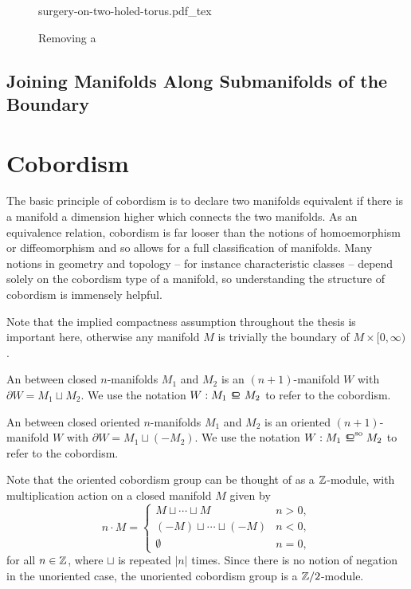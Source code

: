 \begin{figure}[ht]
	{surgery-on-two-holed-torus.pdf_tex}
	\caption{Removing a }
\end{figure}

\subsection{Joining Manifolds Along Submanifolds of the Boundary}

\pagebreak
\section{Cobordism}\label{sec:cobordism}

The basic principle of cobordism is to declare two manifolds equivalent if there is a manifold a dimension higher which connects the two manifolds. As an equivalence relation, cobordism is far looser than the notions of homoemorphism or diffeomorphism and so allows for a full classification of manifolds. Many notions in geometry and topology -- for instance characteristic classes -- depend solely on the cobordism type of a manifold, so understanding the structure of cobordism is immensely helpful.

\begin{remark}
	Note that the implied compactness assumption throughout the thesis is important here, otherwise any manifold $M$ is trivially the boundary of $M\times [0,\infty)$.
\end{remark}

\begin{definition}
	An  between closed $n$-manifolds $M_1$ and $M_2$ is an $(n+1)$-manifold $W$ with $\partial W = M_1\sqcup M_2$. We use the notation $W : M_1\bord M_2$ to refer to the cobordism.
\end{definition}

\begin{definition}
	An  between closed oriented $n$-manifolds $M_1$ and $M_2$ is an oriented $(n+1)$-manifold $W$ with $\partial W = M_1\sqcup (-M_2)$. We use the notation $W : M_1\sobord M_2$ to refer to the cobordism.
\end{definition}

\begin{remark}
\end{remark}

Note that the oriented cobordism group can be thought of as a $\mathbb{Z}$-module, with multiplication action on a closed manifold $M$ given by
\[
	n \cdot M = \begin{cases} M\sqcup \cdots \sqcup M & n > 0,\\ (-M)\sqcup \cdots \sqcup (-M) & n < 0,\\ \emptyset & n=0,\end{cases}
\]
for all $n\in \mathbb{Z}$, where $\sqcup$ is repeated $|n|$ times. Since there is no notion of negation in the unoriented case, the unoriented cobordism group is a $\mathbb{Z}/2$-module.

